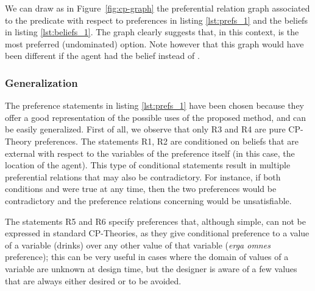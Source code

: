 We can draw as in Figure~\ref{fig:cp-graph} the preferential relation graph associated to the predicate  with respect to preferences in listing \ref{lst:prefs_1} and the beliefs in listing \ref{lst:beliefs_1}. The graph clearly suggests that, in this context,  is the most preferred (undominated) option. Note however that this graph would have been different if the agent had the belief  instead of . %

\subsubsection{Generalization}

The preference statements in listing \ref{lst:prefs_1} have been chosen because they offer a good representation of the possible uses of the proposed method, and can be easily generalized. First of all, we observe that only R3 and R4 are pure CP-Theory preferences. The statements R1, R2 are conditioned on beliefs that are external with respect to the variables of the preference itself (in this case, the location of the agent). This type of conditional statements result in multiple preferential relations that may also be contradictory. %
For instance, if both conditions  and  were true at any time, then the two preferences would be contradictory and the preference relations concerning  would be unsatisfiable.

The statements R5 and R6 specify preferences that, although simple, can not be expressed in standard CP-Theories, as they give conditional preference to a value of a variable (drinks) over any other value of that variable (\textit{erga omnes} preference); this can be very useful in cases where the domain of values of a variable are unknown at design time, but the designer is aware of a few values that are always either desired or to be avoided. 

